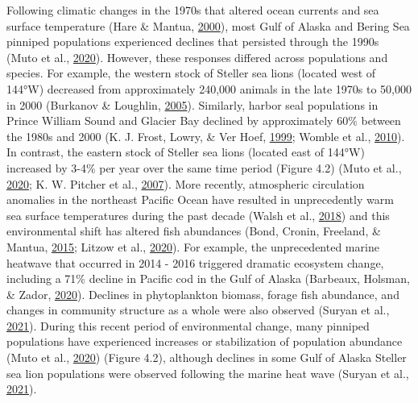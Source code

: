 \documentclass [11pt, proquest] {uwthesis}[2015/03/03]
\begin{document}
Following climatic changes in the 1970s that altered ocean currents and
sea surface temperature (Hare \& Mantua,
\protect\hyperlink{ref-Hare2000}{2000}), most Gulf of Alaska and Bering
Sea pinniped populations experienced declines that persisted through the
1990s (Muto et al., \protect\hyperlink{ref-Muto2020}{2020}). However,
these responses differed across populations and species. For example,
the western stock of Steller sea lions (located west of 144°W) decreased
from approximately 240,000 animals in the late 1970s to 50,000 in 2000
(Burkanov \& Loughlin, \protect\hyperlink{ref-Burkanov2005}{2005}).
Similarly, harbor seal populations in Prince William Sound and Glacier
Bay declined by approximately 60\% between the 1980s and 2000 (K. J.
Frost, Lowry, \& Ver Hoef, \protect\hyperlink{ref-Frost1999}{1999};
Womble et al., \protect\hyperlink{ref-Womble2010}{2010}). In contrast,
the eastern stock of Steller sea lions (located east of 144°W) increased
by 3-4\% per year over the same time period (Figure 4.2) (Muto et al.,
\protect\hyperlink{ref-Muto2020}{2020}; K. W. Pitcher et al.,
\protect\hyperlink{ref-Pitcher2007}{2007}). More recently, atmospheric
circulation anomalies in the northeast Pacific Ocean have resulted in
unprecedently warm sea surface temperatures during the past decade
(Walsh et al., \protect\hyperlink{ref-Walsh2018}{2018}) and this
environmental shift has altered fish abundances (Bond, Cronin, Freeland,
\& Mantua, \protect\hyperlink{ref-Bond2015}{2015}; Litzow et al.,
\protect\hyperlink{ref-Litzow2020}{2020}). For example, the
unprecedented marine heatwave that occurred in 2014 - 2016 triggered
dramatic ecosystem change, including a 71\% decline in Pacific cod in
the Gulf of Alaska (Barbeaux, Holsman, \& Zador,
\protect\hyperlink{ref-Barbeaux2020}{2020}). Declines in phytoplankton
biomass, forage fish abundance, and changes in community structure as a
whole were also observed (Suryan et al.,
\protect\hyperlink{ref-Suryan2021}{2021}). During this recent period of
environmental change, many pinniped populations have experienced
increases or stabilization of population abundance (Muto et al.,
\protect\hyperlink{ref-Muto2020}{2020}) (Figure 4.2), although declines
in some Gulf of Alaska Steller sea lion populations were observed
following the marine heat wave (Suryan et al.,
\protect\hyperlink{ref-Suryan2021}{2021}).
\end{document}
